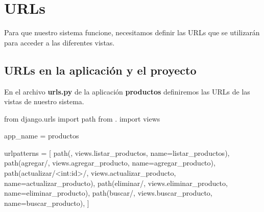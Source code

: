 \documentclass[
  a4paper,
  DIV=11,
  numbers=noendperiod,
  onepage,
  openany]{scrreprt}
\newenvironment{Shaded}{\begin{snugshade}}{\end{snugshade}}
\newcommand{\ImportTok}[1]{\textcolor[rgb]{0.00,0.46,0.62}{#1}}
\newcommand{\NormalTok}[1]{\textcolor[rgb]{0.00,0.23,0.31}{#1}}
\newcommand{\OperatorTok}[1]{\textcolor[rgb]{0.37,0.37,0.37}{#1}}
\newcommand{\StringTok}[1]{\textcolor[rgb]{0.13,0.47,0.30}{#1}}
\begin{document}
\chapter{URLs}\label{urls}

Para que nuestro sistema funcione, necesitamos definir las URLs que se
utilizarán para acceder a las diferentes vistas.

\section{URLs en la aplicación y el
proyecto}\label{urls-en-la-aplicaciuxf3n-y-el-proyecto}

En el archivo \textbf{urls.py} de la aplicación \textbf{productos}
definiremos las URLs de las vistas de nuestro sistema.

\begin{Shaded}
\begin{Highlighting}[]
\ImportTok{from}\NormalTok{ django.urls }\ImportTok{import}\NormalTok{ path}
\ImportTok{from}\NormalTok{ . }\ImportTok{import}\NormalTok{ views}

\NormalTok{app\_name }\OperatorTok{=} \StringTok{\textquotesingle{}productos\textquotesingle{}}

\NormalTok{urlpatterns }\OperatorTok{=}\NormalTok{ [}
\NormalTok{    path(}\StringTok{\textquotesingle{}\textquotesingle{}}\NormalTok{, views.listar\_productos, name}\OperatorTok{=}\StringTok{\textquotesingle{}listar\_productos\textquotesingle{}}\NormalTok{),}
\NormalTok{    path(}\StringTok{\textquotesingle{}agregar/\textquotesingle{}}\NormalTok{, views.agregar\_producto, name}\OperatorTok{=}\StringTok{\textquotesingle{}agregar\_producto\textquotesingle{}}\NormalTok{),}
\NormalTok{    path(}\StringTok{\textquotesingle{}actualizar/\textless{}int:id\textgreater{}/\textquotesingle{}}\NormalTok{, views.actualizar\_producto, name}\OperatorTok{=}\StringTok{\textquotesingle{}actualizar\_producto\textquotesingle{}}\NormalTok{),}
\NormalTok{    path(}\StringTok{\textquotesingle{}eliminar/\textquotesingle{}}\NormalTok{, views.eliminar\_producto, name}\OperatorTok{=}\StringTok{\textquotesingle{}eliminar\_producto\textquotesingle{}}\NormalTok{),}
\NormalTok{    path(}\StringTok{\textquotesingle{}buscar/\textquotesingle{}}\NormalTok{, views.buscar\_producto, name}\OperatorTok{=}\StringTok{\textquotesingle{}buscar\_producto\textquotesingle{}}\NormalTok{),}
\NormalTok{]}
\end{Highlighting}
\end{Shaded}
\end{document}
